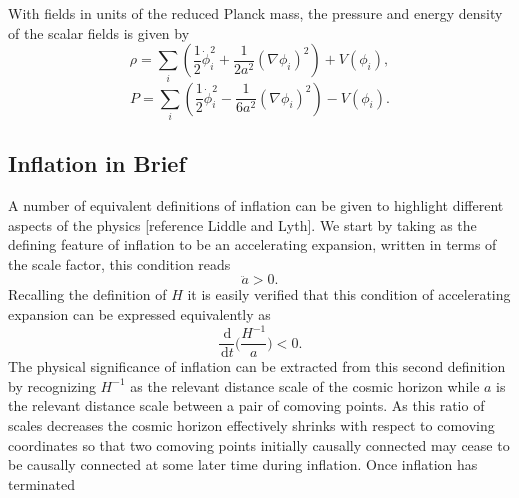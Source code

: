 \documentclass[letterpaper,11pt]{article}
\newcommand{\ud}{\,\mathrm{d}}
\begin{document}
With fields in units of the reduced Planck mass, the pressure and energy density of the scalar fields is given by
\begin{equation}
\rho = \sum_i (\frac{1}{2}\dot{\phi}_i^2 + \frac{1}{2a^2}(\nabla\phi_i)^2) + V(\phi_i), \label{rho eqn}
\end{equation}
\begin{equation}
P = \sum_i (\frac{1}{2}\dot{\phi}_i^2 - \frac{1}{6a^2}(\nabla\phi_i)^2) - V(\phi_i). \label{p eqn}
\end{equation}




\subsection{Inflation in Brief}
A number of equivalent definitions of inflation can be given to highlight different aspects of the physics [reference Liddle and Lyth]. We start by taking as the defining feature of inflation to be an accelerating expansion, written in terms of the scale factor, this condition reads
\begin{equation}
\ddot{a}>0.
\end{equation}
Recalling the definition of $H$ it is easily verified that this condition of accelerating expansion can be expressed equivalently as
\begin{equation}
\frac{\ud}{\ud t}\bigg(\frac{H^{-1}}{a}\bigg)<0.
\end{equation}
The physical significance of inflation can be extracted from this second definition by recognizing $H^{-1}$ as the relevant distance scale of the cosmic horizon while $a$ is the relevant distance scale between a pair of comoving points. As this ratio of scales decreases the cosmic horizon effectively shrinks with respect to comoving coordinates so that two comoving points initially causally connected may cease to be causally connected at some later time during inflation. Once inflation has terminated %
\end{document}
